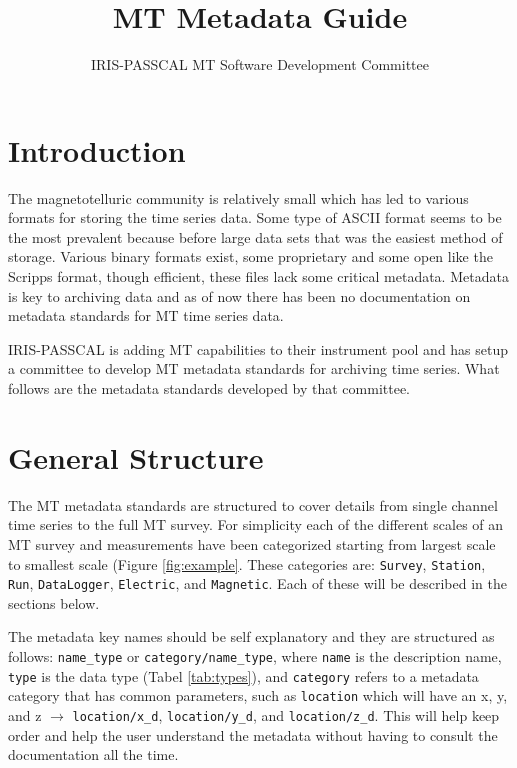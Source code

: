 \documentclass{article}
\title{MT Metadata Guide}
\author[1]{IRIS-PASSCAL MT Software Development Committee}
\affil[1]{IRIS}
\begin{document}
	
\maketitle

\tableofcontents

\newpage

\section{Introduction}

The magnetotelluric community is relatively small which has led to various formats for storing the time series data.  Some type of ASCII format seems to be the most prevalent because before large data sets that was the easiest method of storage. Various binary formats exist, some proprietary and some open like the Scripps format, though efficient, these files lack some critical metadata.  Metadata is key to archiving data and as of now there has been no documentation on metadata standards for MT time series data.  

IRIS-PASSCAL is adding MT capabilities to their instrument pool and has setup a committee to develop MT metadata standards for archiving time series.  What follows are the metadata standards developed by that committee.


\section{General Structure}

The MT metadata standards are structured to cover details from single channel time series to the full MT survey.  For simplicity each of the different scales of an MT survey and measurements have been categorized starting from largest scale to smallest scale (Figure \ref{fig:example}.  These categories are: \verb|Survey|, \verb|Station|, \verb|Run|, \verb|DataLogger|, \verb|Electric|, and \verb|Magnetic|.  Each of these will be described in the sections below.  

The metadata key names should be self explanatory and they are structured as follows: \verb|name_type| or \verb|category/name_type|, where \verb|name| is the description name, \verb|type| is the data type (Tabel \ref{tab:types}), and \verb|category| refers to a metadata category that has common parameters, such as \verb|location| which will have an x, y, and z $\longrightarrow$ \verb|location/x_d|, \verb|location/y_d|, and \verb|location/z_d|. This will help keep order and help the user understand the metadata without having to consult the documentation all the time. 
\end{document}
